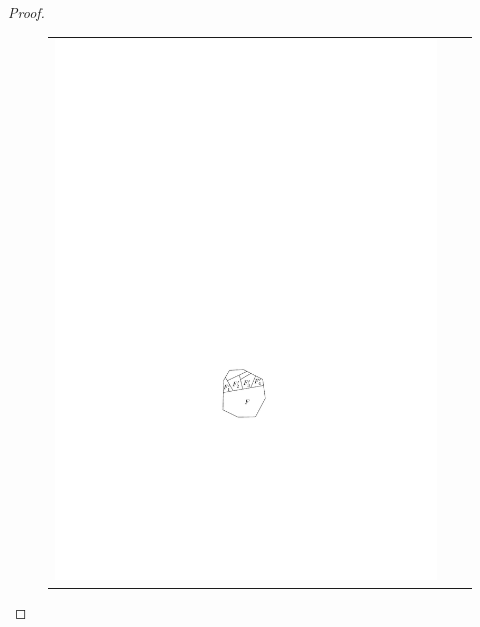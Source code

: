 \documentclass{article}
\begin{document}
\begin{proof}
\begin{figure}
\begin{center}
\begin{tabular}{ccc}
      \includegraphics{chop-b} &   

\end{tabular}
\end{center}
\end{figure}
\end{proof}
\end{document}
